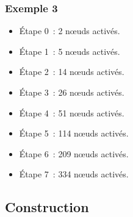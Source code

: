 \documentclass[12pt]{beamer}
\begin{document}
\begin{frame}
\frametitle{Exemple 3}

\begin{itemize}
 \item Étape 0~: 2  n\oe{}uds activés.
 \item Étape 1~: 5  n\oe{}uds activés.
 \item Étape 2~: 14 n\oe{}uds activés.
 \item Étape 3~: 26 n\oe{}uds activés.
 \item Étape 4~: 51 n\oe{}uds activés.
 \item Étape 5~: 114 n\oe{}uds activés.
 \item Étape 6~: 209 n\oe{}uds activés.
 \item Étape 7~: 334 n\oe{}uds activés.
\end{itemize}


\end{frame}

%  
% 
%  



\subsection{Construction}
\end{document}
